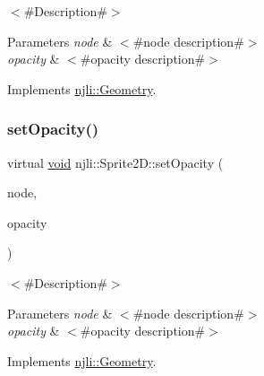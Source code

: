 $<$\#\+Description\#$>$


\begin{DoxyParams}{Parameters}
{\em node} & $<$\#node description\#$>$ \\
\hline
{\em opacity} & $<$\#opacity description\#$>$ \\
\hline
\end{DoxyParams}


Implements \mbox{\hyperlink{classnjli_1_1_geometry_a4ba0fc9934e40c651b89969d47b03d3b}{njli\+::\+Geometry}}.

\mbox{\label{classnjli_1_1_sprite2_d_abf2ee9acb5cd301b5a4029181be7b155}} 
\subsubsection{\texorpdfstring{set\+Opacity()}{setOpacity()}}
{\footnotesize\ttfamily virtual \mbox{\hyperlink{_thread_8h_af1e856da2e658414cb2456cb6f7ebc66}{void}} njli\+::\+Sprite2\+D\+::set\+Opacity (\begin{DoxyParamCaption}\item[{\mbox{\hyperlink{classnjli_1_1_node}{Node}} $\ast$}]{node,  }\item[{\mbox{\hyperlink{_util_8h_a5f6906312a689f27d70e9d086649d3fd}{f32}}}]{opacity }\end{DoxyParamCaption})\hspace{0.3cm}{\ttfamily [virtual]}}

$<$\#\+Description\#$>$


\begin{DoxyParams}{Parameters}
{\em node} & $<$\#node description\#$>$ \\
\hline
{\em opacity} & $<$\#opacity description\#$>$ \\
\hline
\end{DoxyParams}


Implements \mbox{\hyperlink{classnjli_1_1_geometry_ad4f8c2a3b873a63ee62c87d512b9540d}{njli\+::\+Geometry}}.

\mbox{\label{classnjli_1_1_sprite2_d_a318f37bf46314d96ce9c70794cf6125a}} 
